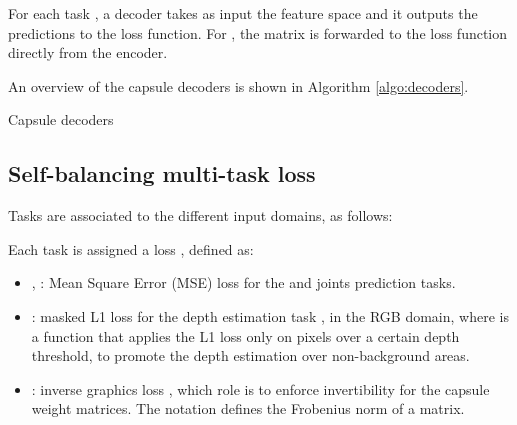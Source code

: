 \documentclass[10pt,twocolumn,letterpaper]{article}
\begin{document}
For each task , a decoder  takes as input the feature space  and it outputs the predictions  to the loss function. For , the  matrix is forwarded to the loss function directly from the encoder.

An overview of the capsule decoders is shown in Algorithm \ref{algo:decoders}. 

\begin{algorithm}
  \caption{Capsule decoders}

 \label{algo:decoders}
\end{algorithm}

\subsection{Self-balancing multi-task loss}
\label{subsec:loss}

Tasks are associated to the different input domains, as follows: 


\begin{table}[!htbp]
\centering
{}
\label{tab:tasks}
\end{table}

Each task is assigned a loss , defined as:


\newcommand{\norm}[1]{\left\lVert#1\right\rVert}
\begin{itemize}
    \item , : Mean Square Error (MSE) loss for the  and  joints prediction tasks.
    \item : masked L1 loss for the depth estimation task , in the RGB domain, where  is a function that applies the L1 loss only on pixels over a certain depth threshold, to promote the depth estimation over non-background areas.
    \item : inverse graphics loss , which role is to enforce invertibility for the capsule weight matrices. The notation  defines the Frobenius norm of a matrix.
\end{itemize}
\end{document}
